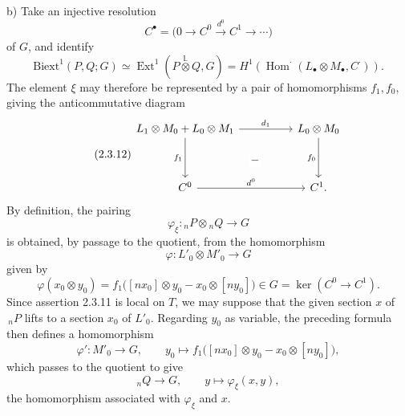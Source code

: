 \medskip
\noindent b) Take an injective resolution
\[
 C^\bullet=\bigl(0\longrightarrow C^0
 \xrightarrow{d^0}C^1\longrightarrow\cdots\bigr)
\]
of $G$, and identify
\[
 \mathrm{Biext}^1(P,Q;G)
 \simeq
 \operatorname{Ext}^1\!\left(
   P\mathbin{\overset{\mathbb L}{\otimes}}Q,G
 \right)
 =H^1\!\left(
   \operatorname{Hom}^{\boldsymbol\cdot}
   (L_\bullet\otimes M_\bullet,C^{\boldsymbol\cdot})
 \right).
\]
The element $\xi$ may therefore be represented by a pair of
homomorphisms $f_1,f_0$, giving the anticommutative diagram
\begin{equation}\tag{2.3.12}
\begin{tikzcd}[column sep=huge,row sep=huge]
 L_1\otimes M_0+L_0\otimes M_1
   \arrow[r,"d_1"]
   \arrow[d,"f_1"']
   \arrow[rd,phantom,"-" description]&
 L_0\otimes M_0
   \arrow[d,"f_0"']\\
 C^0\arrow[r,"d^0"]&C^1.
\end{tikzcd}
\end{equation}
By definition, the pairing
\[
 \varphi_\xi:{}_nP\otimes{}_nQ\longrightarrow G
\]
is obtained, by passage to the quotient, from the homomorphism
\[
 \varphi:L'_0\otimes M'_0\longrightarrow G
\]
given by
\begin{equation}\tag{2.3.13}
 \varphi(x_0\otimes y_0)
 =f_1\bigl([nx_0]\otimes y_0-x_0\otimes[ny_0]\bigr)
 \in G=\ker(C^0\longrightarrow C^1).
\end{equation}
Since assertion 2.3.11 is local on $T$, we may suppose that the given
section $x$ of $\,{}_nP$ lifts to a section $x_0$ of $L'_0$.
Regarding $y_0$ as variable, the preceding formula then defines a
homomorphism
\begin{equation}\tag{2.3.14}
 \varphi':M'_0\longrightarrow G,
 \qquad
 y_0\longmapsto
 f_1\bigl([nx_0]\otimes y_0-x_0\otimes[ny_0]\bigr),
\end{equation}
which passes to the quotient to give
\[
 {}_nQ\longrightarrow G,
 \qquad
 y\longmapsto\varphi_\xi(x,y),
\]
the homomorphism associated with $\varphi_\xi$ and $x$.
